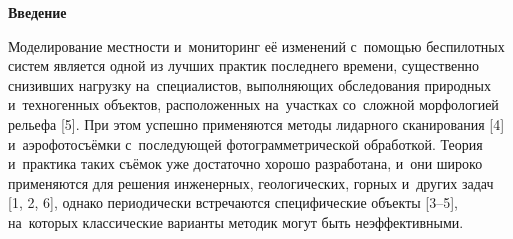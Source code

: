  



\makeProcTitleRazdelNewLine


\textbf{Введение}

Моделирование местности и~мониторинг её изменений с~помощью беспилотных систем является одной из лучших практик последнего времени, существенно снизивших нагрузку на~специалистов, выполняющих обследования природных и~техногенных объектов, расположенных на~участках со~сложной морфологией рельефа [5]. При этом успешно применяются методы лидарного сканирования [4] и~аэрофотосъёмки с~последующей фотограмметрической обработкой. Теория и~практика таких съёмок уже достаточно хорошо разработана, и~они широко применяются для решения инженерных, геологических, горных и~других задач [1, 2, 6], однако периодически встречаются специфические объекты [3--5], на~которых классические варианты методик могут быть неэффективными.

